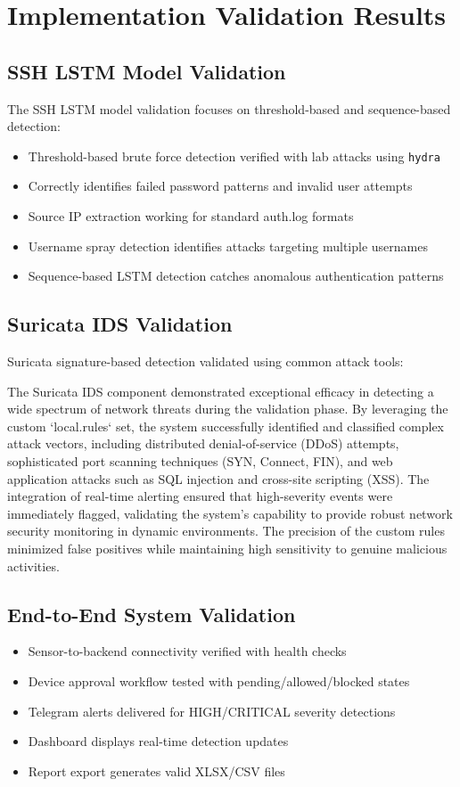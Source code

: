 \documentclass[12pt,a4paper]{report} %
\begin{document}
\section{Implementation Validation Results}
\label{sec:validation}

\subsection{SSH LSTM Model Validation}
The SSH LSTM model validation focuses on threshold-based and sequence-based detection:

\begin{itemize}
	\item Threshold-based brute force detection verified with lab attacks using \texttt{hydra}
	\item Correctly identifies failed password patterns and invalid user attempts
	\item Source IP extraction working for standard auth.log formats
	\item Username spray detection identifies attacks targeting multiple usernames
	\item Sequence-based LSTM detection catches anomalous authentication patterns
\end{itemize}

\subsection{Suricata IDS Validation}
Suricata signature-based detection validated using common attack tools:

The Suricata IDS component demonstrated exceptional efficacy in detecting a wide spectrum of network threats during the validation phase. By leveraging the custom `local.rules` set, the system successfully identified and classified complex attack vectors, including distributed denial-of-service (DDoS) attempts, sophisticated port scanning techniques (SYN, Connect, FIN), and web application attacks such as SQL injection and cross-site scripting (XSS). The integration of real-time alerting ensured that high-severity events were immediately flagged, validating the system's capability to provide robust network security monitoring in dynamic environments. The precision of the custom rules minimized false positives while maintaining high sensitivity to genuine malicious activities.

\subsection{End-to-End System Validation}
\begin{itemize}
	\item Sensor-to-backend connectivity verified with health checks
	\item Device approval workflow tested with pending/allowed/blocked states
	\item Telegram alerts delivered for HIGH/CRITICAL severity detections
	\item Dashboard displays real-time detection updates
	\item Report export generates valid XLSX/CSV files
\end{itemize}
\end{document}
